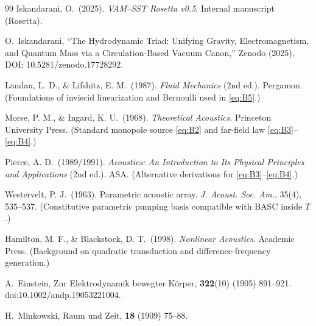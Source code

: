 \documentclass[10pt,reprint,aps,onecolumn,nofootinbib]{revtex4-2}
\begin{document}
\begin{thebibliography}{99}
                Iskandarani, O.\ (2025).
                \emph{VAM–SST Rosetta v0.5}.
                Internal manuscript (Rosetta).

                O.~Iskandarani,
                ``The Hydrodynamic Triad: Unifying Gravity, Electromagnetism, and Quantum Mass
                via a Circulation-Based Vacuum Canon,''
                Zenodo (2025), DOI: 10.5281/zenodo.17728292.

                Landau, L. D., \& Lifshitz, E. M.\ (1987).
                \emph{Fluid Mechanics} (2nd ed.). Pergamon.
                (Foundations of inviscid linearization and Bernoulli used in \eqref{eq:B5}.)

                Morse, P. M., \& Ingard, K. U.\ (1968).
                \emph{Theoretical Acoustics}. Princeton University Press.
                (Standard monopole source \eqref{eq:B2} and far-field law \eqref{eq:B3}–\eqref{eq:B4}.)

                Pierce, A. D.\ (1989/1991).
                \emph{Acoustics: An Introduction to Its Physical Principles and Applications} (2nd ed.). ASA.
                (Alternative derivations for \eqref{eq:B3}–\eqref{eq:B4}.)

                Westervelt, P. J.\ (1963).
                Parametric acoustic array.
                \emph{J. Acoust. Soc. Am.}, 35(4), 535–537.
                (Constitutive parametric pumping basis compatible with BASC inside $T$.)

                Hamilton, M. F., \& Blackstock, D. T.\ (1998).
                \emph{Nonlinear Acoustics}. Academic Press.
                (Background on quadratic transduction and difference-frequency generation.)


                A.~Einstein,
                \newblock Zur Elektrodynamik bewegter K{\"o}rper,
                 \textbf{322}(10) (1905) 891--921.
                \newblock doi:10.1002/andp.19053221004.

                H.~Minkowski,
                \newblock Raum und Zeit,
                 \textbf{18} (1909) 75--88.


\end{thebibliography}
\end{document}
